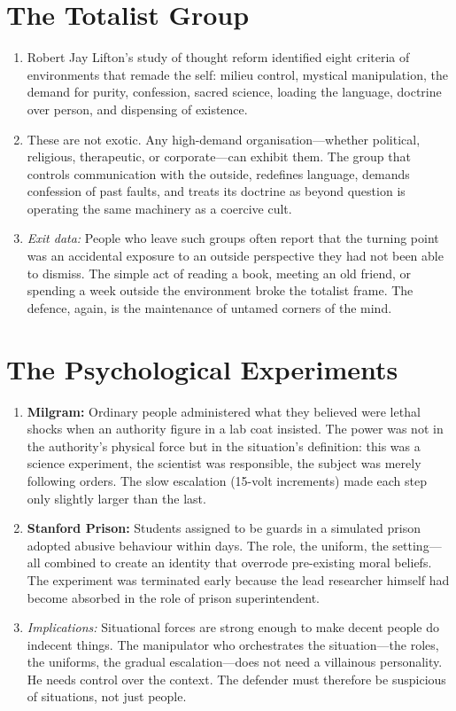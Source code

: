 \documentclass[12pt,a4paper,oneside]{book}
\begin{document}
\section{The Totalist Group}
\begin{enumerate}[leftmargin=*, label=\arabic*.]
\item Robert Jay Lifton's study of thought reform identified eight criteria of environments that remade the self: milieu control, mystical manipulation, the demand for purity, confession, sacred science, loading the language, doctrine over person, and dispensing of existence.
\item These are not exotic. Any high-demand organisation—whether political, religious, therapeutic, or corporate—can exhibit them. The group that controls communication with the outside, redefines language, demands confession of past faults, and treats its doctrine as beyond question is operating the same machinery as a coercive cult.
\item \textit{Exit data:} People who leave such groups often report that the turning point was an accidental exposure to an outside perspective they had not been able to dismiss. The simple act of reading a book, meeting an old friend, or spending a week outside the environment broke the totalist frame. The defence, again, is the maintenance of untamed corners of the mind.
\end{enumerate}

\section{The Psychological Experiments}
\begin{enumerate}[leftmargin=*, label=\arabic*.]
\item \textbf{Milgram:} Ordinary people administered what they believed were lethal shocks when an authority figure in a lab coat insisted. The power was not in the authority's physical force but in the situation's definition: this was a science experiment, the scientist was responsible, the subject was merely following orders. The slow escalation (15-volt increments) made each step only slightly larger than the last.
\item \textbf{Stanford Prison:} Students assigned to be guards in a simulated prison adopted abusive behaviour within days. The role, the uniform, the setting—all combined to create an identity that overrode pre-existing moral beliefs. The experiment was terminated early because the lead researcher himself had become absorbed in the role of prison superintendent.
\item \textit{Implications:} Situational forces are strong enough to make decent people do indecent things. The manipulator who orchestrates the situation—the roles, the uniforms, the gradual escalation—does not need a villainous personality. He needs control over the context. The defender must therefore be suspicious of situations, not just people.
\end{enumerate}
\end{document}
